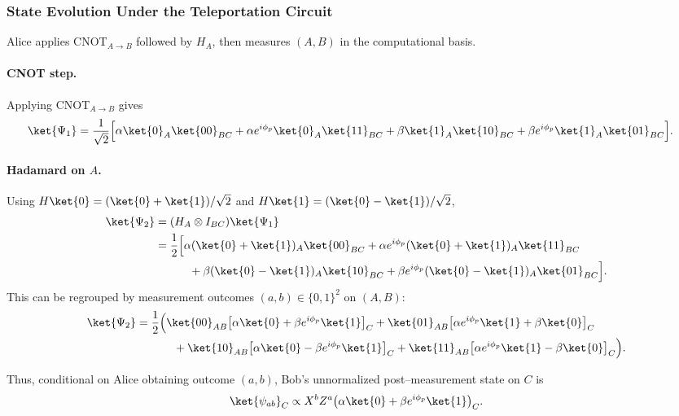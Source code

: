 \documentclass[11pt]{article}
\begin{document}
\subsubsection{State Evolution Under the Teleportation Circuit}

Alice applies CNOT$_{A\to B}$ followed by $H_A$, then measures $(A,B)$ in the computational basis.

\paragraph{CNOT step.}
Applying CNOT$_{A\to B}$ gives
\begin{align*}
  \ket{\Psi_1}
  &= \frac{1}{\sqrt{2}}
     \Bigl[
       \alpha\ket{0}_A\ket{00}_{BC}
       + \alpha e^{i\phi_p}\ket{0}_A\ket{11}_{BC}
       + \beta\ket{1}_A\ket{10}_{BC}
       + \beta e^{i\phi_p}\ket{1}_A\ket{01}_{BC}
     \Bigr].
\end{align*}

\paragraph{Hadamard on $A$.}
Using $H\ket{0} = (\ket{0}+\ket{1})/\sqrt{2}$ and $H\ket{1} = (\ket{0}-\ket{1})/\sqrt{2}$,
\begin{align*}
  \ket{\Psi_2}
  &= (H_A\otimes I_{BC})\ket{\Psi_1} \\
  &= \frac{1}{2}
     \Bigl[
       \alpha (\ket{0}+\ket{1})_A \ket{00}_{BC}
       + \alpha e^{i\phi_p} (\ket{0}+\ket{1})_A \ket{11}_{BC} \\
  &\qquad\quad
       + \beta (\ket{0}-\ket{1})_A \ket{10}_{BC}
       + \beta e^{i\phi_p} (\ket{0}-\ket{1})_A \ket{01}_{BC}
     \Bigr].
\end{align*}
This can be regrouped by measurement outcomes $(a,b)\in\{0,1\}^2$ on $(A,B)$:
\begin{align*}
  \ket{\Psi_2}
  &= \frac{1}{2}\Bigl(
     \ket{00}_{AB}\bigl[\alpha\ket{0} + \beta e^{i\phi_p}\ket{1}\bigr]_C
   + \ket{01}_{AB}\bigl[\alpha e^{i\phi_p}\ket{1} + \beta\ket{0}\bigr]_C \\
  &\hspace{3.3em}
   + \ket{10}_{AB}\bigl[\alpha\ket{0} - \beta e^{i\phi_p}\ket{1}\bigr]_C
   + \ket{11}_{AB}\bigl[\alpha e^{i\phi_p}\ket{1} - \beta\ket{0}\bigr]_C
   \Bigr).
\end{align*}

Thus, conditional on Alice obtaining outcome $(a,b)$, Bob's unnormalized post–measurement state on $C$ is
\[
  \ket{\psi_{ab}}_C \propto X^b Z^a \bigl(\alpha\ket{0} + \beta e^{i\phi_p}\ket{1}\bigr)_C.
\]
\end{document}
